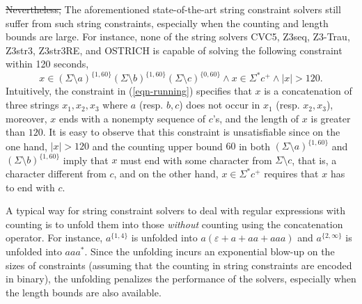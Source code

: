 \sout{Nevertheless, }The aforementioned state-of-the-art string constraint solvers still suffer from such string constraints, especially when the counting and length bounds are large. For instance, none of the string solvers CVC5, Z3seq, Z3-Trau, Z3str3, Z3str3RE, and OSTRICH is capable of solving the following constraint within 120 seconds,
%
\begin{equation}\label{eqn-running}
x \in (\Sigma \setminus a)^{\{1, 60\}} (\Sigma \setminus b)^{\{1, 60\}} (\Sigma \setminus c)^{\{0, 60\}} \wedge x \in \Sigma^* c^+ \wedge |x| > 120.
\end{equation}
Intuitively, the constraint in (\ref{eqn-running}) specifies that $x$ is a concatenation of three strings $x_1, x_2, x_3$ where $a$ (resp. $b, c$) does not occur in $x_1$ (resp. $x_2, x_3$), moreover, $x$ ends with a nonempty sequence of $c$'s, and the length of $x$ is greater than $120$. It is easy to observe that this constraint is unsatisfiable since on the one hand, $|x| > 120$ and the counting upper bound $60$ in both $(\Sigma \setminus a)^{\{1, 60\}}$ and $(\Sigma \setminus b)^{\{1, 60\}}$ imply that $x$ must end with some character from $\Sigma \setminus c$, that is, a character different from $c$, and on the other hand, $x \in \Sigma^*c^+$ requires that $x$ has to end with $c$.

A typical way for string constraint solvers to deal with regular expressions with counting is to unfold them into those \emph{without} counting using the concatenation operator. For instance, $a^{\{1, 4\}}$ is unfolded into $a(\varepsilon + a + aa + aaa)$ and $a^{\{2,\infty\}}$ is unfolded into $aaa^{*}$. Since the unfolding incurs an exponential blow-up on the sizes of constraints (assuming that the counting in string constraints are encoded in binary), the unfolding penalizes the performance of the solvers, especially when the length bounds are also available.

